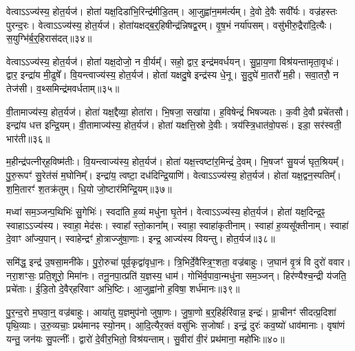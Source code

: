 वेत्वा\-ऽ\-ऽ\-ज्य॑स्य॒ होत॒र्यज॑।
होता॑ यक्ष॒दिडा॑भि॒रिन्द्र॑मीडि॒तम्।
आ॒जुह्वा॑न॒मम॑र्त्यम्।
दे॒वो दे॒वैः सवी᳚र्यः।
वज्र॑हस्तः पुरन्द॒रः।
वेत्वा\-ऽ\-ऽ\-ज्य॑स्य॒ होत॒र्यज॑।
होता॑यक्षद्ब॒र्॒हिषीन्द्र॑न्निषद्व॒रम्।
वृ॒ष॒भं नर्या॑पसम्।
वसु॑भीरु॒द्रैरा॑दि॒त्यैः।
स॒युग्भि॑र्ब॒र्॒हिरा\-स॑दत्॥३४॥\ip

वेत्वा\-ऽ\-ऽ\-ज्य॑स्य॒ होत॒र्यज॑।
होता॑ यक्ष॒दोजो॒ न वी॒र्यम्᳚।
सहो॒ द्वार॒ इन्द्र॑मवर्धयन्।
सु॒प्रा॒य॒णा विश्र॑यन्तामृता॒वृधः॑।
द्वार॒ इन्द्रा॑य मी॒ढुषे᳚।
वि॒यन्त्वाज्य॑स्य॒ होत॒र्यज॑।
होता॑ यक्षदु॒षे इन्द्र॑स्य धे॒नू।
सु॒दुघे॑ मा॒तरौ॑ म॒ही।
सवा॒तरौ॒ न तेज॑सी।
व॒थ्समिन्द्र॑मवर्धताम्॥३५॥\ip

वी॒तामाज्य॑स्य॒ होत॒र्यज॑।
होता॑ यक्ष॒द्दैव्या॒ होता॑रा।
भि॒षजा॒ सखा॑या।
ह॒विषेन्द्रं॑ भिषज्यतः।
क॒वी दे॒वौ प्रचे॑तसौ।
इन्द्रा॑य धत्त इन्द्रि॒यम्।
वी॒तामाज्य॑स्य॒ होत॒र्यज॑।
होता॑ यक्षत्ति॒स्रो दे॒वीः।
त्रय॑स्त्रि॒धात॑वो॒पसः॑।
इडा॒ सर॑स्वती॒ भार॑ती॥३६॥\ip

म॒हीन्द्र॑पत्नीर्‌\mbox{}ह॒विष्म॑तीः।
वि॒यन्त्वाज्य॑स्य॒ होत॒र्यज॑।
होता॑ यक्ष॒त्त्वष्टा॑र॒मिन्द्रं॑ दे॒वम्।
भि॒षजꣳ॑ सु॒यजं॑ घृत॒श्रियम्᳚।
पु॒रु॒रूपꣳ॑ सु॒रेत॑सं म॒घोनिम्᳚।
इन्द्रा॑य॒ त्वष्टा॒ दध॑दिन्द्रि॒याणि॑।
वेत्वा\-ऽ\-ऽ\-ज्य॑स्य॒ होत॒र्यज॑।
होता॑ यक्ष॒द्वन॒स्पतिम्᳚।
श॒मि॒तारꣳ॑ श॒तक्र॑तुम्।
धि॒यो जो॒ष्टार॑मिन्द्रि॒यम्॥३७॥\ip

मध्वा॑ सम॒ञ्जन्प॒थिभिः॑ सु॒गेभिः॑।
स्वदा॑ति ह॒व्यं मधु॑ना घृ॒तेन॑।
वेत्वा\-ऽ\-ऽ\-ज्य॑स्य॒ होत॒र्यज॑।
होता॑ यक्ष॒दिन्द्र॒ꣴ॒ स्वाहा\-ऽऽज्य॑स्य।
स्वाहा॒ मेद॑सः।
स्वाहा᳚ स्तो॒काना᳚म्।
स्वाहा॒ स्वाहा॑कृतीनाम्।
स्वाहा॑ ह॒व्यसू᳚क्तीनाम्।
स्वाहा॑ दे॒वाꣳ आ᳚ज्य॒पान्।
स्वाहेन्द्रꣳ॑ हो॒त्राज्जु॑षा॒णाः।
इन्द्र॒ आज्य॑स्य वियन्तु।
होत॒र्यज॑॥३८॥\ip\anuvakamend[तेज॑सा\-ऽऽसददवर्धतां॒ भार॑तीन्द्रि॒यं जु॑षा॒णा द्वे च॑ (स॒मिधेन्द्र॒न्तनू॒नपा॑त॒मिडा॑भिर्ब॒र्॒हिष्योज॑ उ॒षे दैव्या॑ ति॒स्रस्त्वष्टा॑रं॒ वन॒स्पति॒मिन्द्रम्᳚॥ स॒मिधेन्द्रं॑ च॒तुर्वेत्वेको॑ वि॒यन्तु॒ द्विर्वी॒तामेको॑ वि॒यन्तु॒ द्विर्वेत्वेको॑ वि॒यन्तु॒ होत॒र्यज॑॥)]

समि॑द्ध॒ इन्द्र॑ उ॒षसा॒मनी॑के।
पु॒रो॒रुचा॑ पूर्व॒कृद्वा॑वृधा॒नः।
त्रि॒भिर्दे॒वैस्त्रि॒ꣳ॒शता॒ वज्र॑बाहुः।
ज॒घान॑ वृ॒त्रं वि दुरो॑ ववार।
नरा॒शꣳसः॒ प्रति॒शूरो॒ मिमा॑नः।
तनू॒नपा॒त्प्रति॑ य॒ज्ञस्य॒ धाम॑।
गोभि॑र्व॒पावा॒न्मधु॑ना सम॒ञ्जन्।
हिर॑ण्यैश्च॒न्द्री य॑जति॒ प्रचे॑ताः।
ई॒डि॒तो दे॒वैर्‌\mbox{}हरि॑वाꣳ अभि॒ष्टिः।
आ॒जुह्वा॑नो ह॒विषा॒ शर्ध॑मानः॥३९॥\ip

पु॒र॒न्द॒रो म॒घवा॒न्॒ वज्र॑बाहुः।
आया॑तु य॒ज्ञमुप॑नो जुषा॒णः।
जु॒षा॒णो ब॒र्‌॒\mbox{}हिर्\mbox{}हरि॑वान्न॒ इन्द्रः॑।
प्रा॒चीनꣳ॑ सीदत्प्र॒दिशा॑ पृथि॒व्याः।
उ॒रु॒व्यचाः॒ प्रथ॑मानꣴ स्यो॒नम्।
आ॒दि॒त्यैर॒क्तं वसु॑भिः स॒जोषाः᳚।
इन्द्रं॒ दुरः॑ कव॒ष्यो॑ धाव॑मानाः।
वृषा॑णं यन्तु॒ जन॑यः सु॒पत्नीः᳚।
द्वारो॑ दे॒वीर॒भितो॒ विश्र॑यन्ताम्।
सु॒वीरा॑ वी॒रं प्रथ॑माना॒ महो॑भिः॥४०॥\ip


